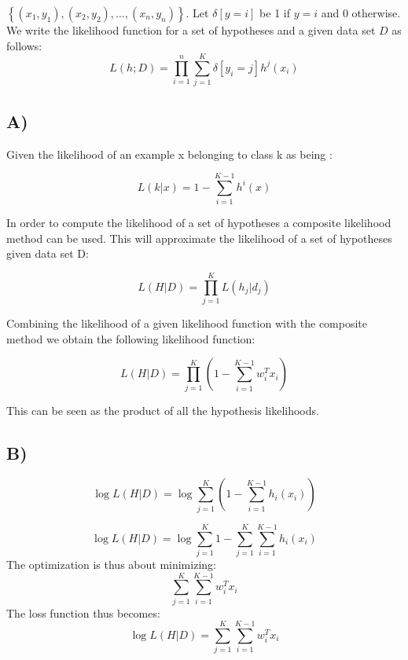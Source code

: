\documentclass{report}
\begin{document}
$\left\{ (x_1,y_1),(x_2,y_2),...,(x_n,y_n)\right\}$.
Let $\delta[y=i]$ be 1 if $y=i$ and 0 otherwise. We write the likelihood function for a set of hypotheses and a given data set $D$ as follows:
$$L(h;D)=\prod_{i=1}^{n}\sum_{j=1}^{K}\delta[y_i=j]h^j(x_i)$$

\subsection*{A)}
Given the likelihood of an example x belonging to class k as being :

\begin{equation}
  L(k | x) = 1 - \sum_{i=1}^{K-1}h^i(x)
\end{equation}

In order to compute the likelihood of a set of hypotheses a composite likelihood
method can be used. This will approximate the likelihood of a set
of hypotheses given data set D:

\begin{equation}
  L(H | D) = \prod_{j=1}^K  L(h_j | d_j)
\end{equation}

Combining the likelihood of a given likelihood function with the composite method
we obtain the following likelihood function:

\begin{equation}
  L(H | D) = \prod_{j=1}^K
  \left(
  1 - \sum_{i=1}^{K-1}w_i^T x_i
  \right)
\end{equation}

This can be seen as the product of all the hypothesis likelihoods.

\subsection*{B)}
\begin{equation}
  \log L(H | D) = \log \sum_{j=1}^K
  \left(
  1 - \sum_{i=1}^{K-1}h_i(x_i)
  \right)
\end{equation}

\begin{equation}
  \log L(H | D) = \log
  \sum_{j=1}^K
  1 - \sum_{j=1}^K \sum_{i=1}^{K-1}h_i(x_i)
\end{equation}
The optimization is thus about minimizing:
\begin{equation}
  \sum_{j=1}^K \sum_{i=1}^{K-1}w_i^T x_i
\end{equation}
The loss function thus becomes:
\begin{equation}
  \log L(H | D) = \sum_{j=1}^K \sum_{i=1}^{K-1}w_i^T x_i
\end{equation}
\end{document}
